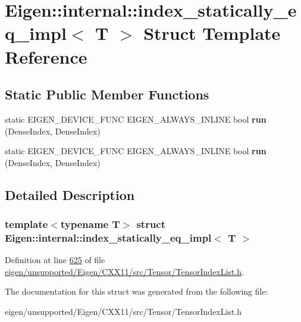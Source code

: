 \hypertarget{struct_eigen_1_1internal_1_1index__statically__eq__impl}{}\section{Eigen\+:\+:internal\+:\+:index\+\_\+statically\+\_\+eq\+\_\+impl$<$ T $>$ Struct Template Reference}
\label{struct_eigen_1_1internal_1_1index__statically__eq__impl}
\subsection*{Static Public Member Functions}
\begin{DoxyCompactItemize}
\item 
\mbox{\label{struct_eigen_1_1internal_1_1index__statically__eq__impl_ada28184328b202bc35e359ef95689378}} 
static E\+I\+G\+E\+N\+\_\+\+D\+E\+V\+I\+C\+E\+\_\+\+F\+U\+NC E\+I\+G\+E\+N\+\_\+\+A\+L\+W\+A\+Y\+S\+\_\+\+I\+N\+L\+I\+NE bool {\bfseries run} (Dense\+Index, Dense\+Index)
\item 
\mbox{\label{struct_eigen_1_1internal_1_1index__statically__eq__impl_ada28184328b202bc35e359ef95689378}} 
static E\+I\+G\+E\+N\+\_\+\+D\+E\+V\+I\+C\+E\+\_\+\+F\+U\+NC E\+I\+G\+E\+N\+\_\+\+A\+L\+W\+A\+Y\+S\+\_\+\+I\+N\+L\+I\+NE bool {\bfseries run} (Dense\+Index, Dense\+Index)
\end{DoxyCompactItemize}


\subsection{Detailed Description}
\subsubsection*{template$<$typename T$>$\newline
struct Eigen\+::internal\+::index\+\_\+statically\+\_\+eq\+\_\+impl$<$ T $>$}



Definition at line \hyperlink{eigen_2unsupported_2_eigen_2_c_x_x11_2src_2_tensor_2_tensor_index_list_8h_source_l00625}{625} of file \hyperlink{eigen_2unsupported_2_eigen_2_c_x_x11_2src_2_tensor_2_tensor_index_list_8h_source}{eigen/unsupported/\+Eigen/\+C\+X\+X11/src/\+Tensor/\+Tensor\+Index\+List.\+h}.



The documentation for this struct was generated from the following file\+:\begin{DoxyCompactItemize}
\item 
eigen/unsupported/\+Eigen/\+C\+X\+X11/src/\+Tensor/\+Tensor\+Index\+List.\+h\end{DoxyCompactItemize}
